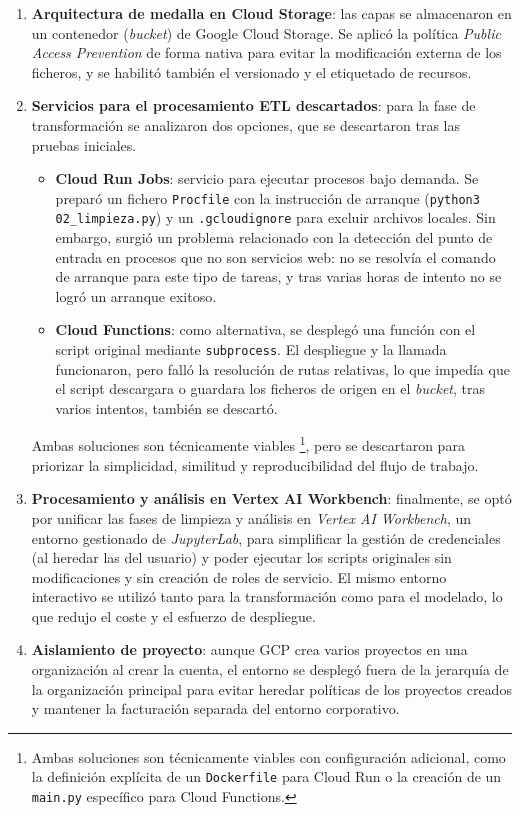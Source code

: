 \begin{enumerate}
	\item \textbf{Arquitectura de medalla en Cloud Storage}: las capas se almacenaron en un contenedor (\textit{bucket}) de Google Cloud Storage. Se aplicó la política \textit{Public Access Prevention} de forma nativa para evitar la modificación externa de los ficheros, y se habilitó también el versionado y el etiquetado de recursos.
	\item \textbf{Servicios para el procesamiento ETL descartados}: para la fase de transformación se analizaron dos opciones, que se descartaron tras las pruebas iniciales.
	\begin{itemize}
		\item \textbf{Cloud Run Jobs}: servicio para ejecutar procesos bajo demanda. Se preparó un fichero \texttt{Procfile} con la instrucción de arranque (\texttt{python3 02\_limpieza.py}) y un \texttt{.gcloudignore} para excluir archivos locales. Sin embargo, surgió un problema relacionado con la detección del punto de entrada en procesos que no son servicios web: no se resolvía el comando de arranque para este tipo de tareas, y tras varias horas de intento no se logró un arranque exitoso.
		\item \textbf{Cloud Functions}: como alternativa, se desplegó una función con el script original mediante \texttt{subprocess}. El despliegue y la llamada funcionaron, pero falló la resolución de rutas relativas, lo que impedía que el script descargara o guardara los ficheros de origen en el \textit{bucket}, tras varios intentos, también se descartó.
	\end{itemize}
	
	Ambas soluciones son técnicamente viables \footnote{Ambas soluciones son técnicamente viables con configuración adicional, como la definición explícita de un \texttt{Dockerfile} para Cloud Run o la creación de un \texttt{main.py} específico para Cloud Functions.}, pero se descartaron para priorizar la simplicidad, similitud y reproducibilidad del flujo de trabajo.
	\item \textbf{Procesamiento y análisis en Vertex AI Workbench}: finalmente, se optó por unificar las fases de limpieza y análisis en \textit{Vertex AI Workbench}, un entorno gestionado de \textit{JupyterLab}, para simplificar la gestión de credenciales (al heredar las del usuario) y poder ejecutar los scripts originales sin modificaciones y sin creación de roles de servicio. El mismo entorno interactivo se utilizó tanto para la transformación como para el modelado, lo que redujo el coste y el esfuerzo de despliegue.
	\item \textbf{Aislamiento de proyecto}: aunque GCP crea varios proyectos en una organización al crear la cuenta, el entorno se desplegó fuera de la jerarquía de la organización principal para evitar heredar políticas de los proyectos creados y mantener la facturación separada del entorno corporativo.
\end{enumerate}

